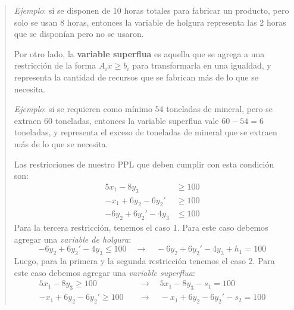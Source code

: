 \begin{quote}
\begin{tcolorbox}[interesting_data, title=¿Qué significa variable de holgura?]
    \textit{Ejemplo}: si se disponen de 10 horas totales para fabricar un producto, pero solo se usan 8 horas, entonces la variable de holgura representa las \(2\) horas que se disponían pero no se usaron. 
  \end{tcolorbox}

  \begin{tcolorbox}[interesting_data, title=¿Qué significa variable superflua?]
    Por otro lado, la \textbf{variable superflua} es aquella que se agrega a una restricción de la forma \(A_i x \geq b_i\) para transformarla en una igualdad, y representa la cantidad de recursos que se fabrican más de lo que se necesita.

    \textit{Ejemplo}: si se requieren como mínimo 54 toneladas de mineral, pero se extraen 60 toneladas, entonces la variable superflua vale \(60 - 54 = 6\) toneladas, y representa el exceso de toneladas de mineral que se extraen más de lo que se necesita. 
  \end{tcolorbox}

  \noindent Las restricciones de nuestro PPL que deben cumplir con esta condición son:
  \begin{align*}
    5x_1 - 8y_3 &\geq 100 \\
    -x_1 + 6y_2 - 6y_2' &\geq 100 \\
    -6y_2 + 6y_2' - 4y_3 &\leq 100
  \end{align*}
  Para la tercera restricción, tenemos el caso 1. Para este caso debemos agregar una \textit{variable de holgura}:
  \[
    -6y_2 + 6y_2' - 4y_3 \leq 100 \quad \rightarrow \quad -6y_2 + 6y_2' - 4y_3 + h_1 = 100
  \]
  Luego, para la primera y la segunda restricción tenemos el caso 2. Para este caso debemos agregar una \textit{variable superflua}:
  \begin{align*}
    5x_1 - 8y_3 \geq 100 \quad &\rightarrow \quad 5x_1 - 8y_3 - s_1 = 100 \\
    -x_1 + 6y_2 - 6y_2' \geq 100 \quad &\rightarrow \quad -x_1 + 6y_2 - 6y_2' - s_2 = 100
  \end{align*}


\end{quote}
